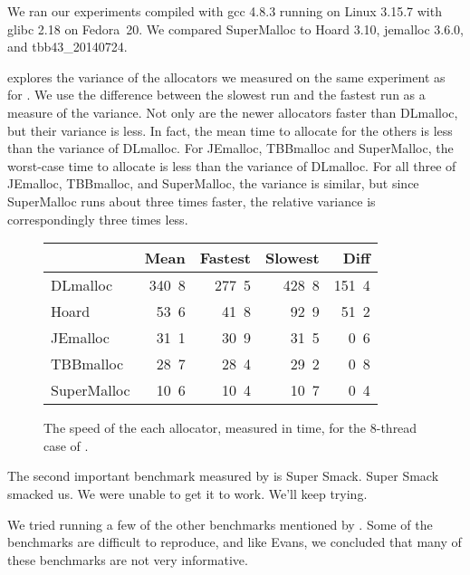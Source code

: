 \documentclass[pldi]{sigplanconf-pldi15}
\newcommand{\ns}[1]{\unit{#1}\nano\second{}}
\begin{document}
We ran our experiments compiled with gcc 4.8.3 running on Linux 3.15.7
with glibc 2.18 on Fedora~20.  We compared SuperMalloc to Hoard 3.10,
jemalloc 3.6.0, and tbb43\_20140724.

 explores the variance of the allocators we measured
on the same experiment as for .  We use the difference
between the slowest run and the fastest run as a measure of the
variance.  Not only are the newer allocators faster than DLmalloc, but
their variance is less.  In fact, the mean time to allocate for the
others is less than the variance of DLmalloc. For JEmalloc, TBBmalloc
and SuperMalloc, the worst-case time to allocate is less than the
variance of DLmalloc.  For all three of JEmalloc, TBBmalloc, and
SuperMalloc, the variance is similar, but since SuperMalloc runs about
three times faster, the relative variance is correspondingly three
times less.

\begin{figure}
\begin{center}
\begin{tabular}{l@{}rrrr}
            & Mean       & Fastest    & Slowest     & Diff       \\ \hline
DLmalloc    & \ns{340.8} & \ns{277.5} & \ns{428.8}  & \ns{151.4} \\
Hoard       & \ns{ 53.6} & \ns{ 41.8} & \ns{ 92.9}  & \ns{ 51.2} \\
JEmalloc    & \ns{ 31.1} & \ns{ 30.9} & \ns{ 31.5}  & \ns{  0.6} \\
TBBmalloc   & \ns{ 28.7} & \ns{ 28.4} & \ns{ 29.2}  & \ns{  0.8} \\
SuperMalloc & \ns{ 10.6} & \ns{ 10.4} & \ns{ 10.7}  & \ns{  0.4} \\
\end{tabular}
\end{center}
\caption{The speed of the each allocator, measured in time, for the
  8-thread case of .  }
\label{fig:variance}
\end{figure}

The second important benchmark measured by \cite{Evans06} is Super
Smack.  Super Smack smacked us.  We were unable to get it to work.
We'll keep trying.

We tried running a few of the other benchmarks mentioned by
\cite{Evans06}.  Some of the benchmarks are difficult to reproduce,
and like Evans, we concluded that many of these benchmarks are not
very informative.
\end{document}
